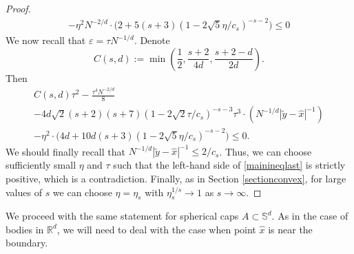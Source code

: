 \documentclass[12pt]{amsart}
\theoremstyle{definition}
\def\R{\mathbb{R}}
\def\ep{\varepsilon}
\newcommand{\1}{\mathbf{1}}
\renewcommand\S{\mathbb{S}}
\begin{document}
\begin{proof}
\begin{multline}
-\eta^2 N^{-2/d}\cdot \Big(2+5 (s+3)(1-2\sqrt{5}\eta / c_s)^{-s-2}\Big)  \leqslant 0
\end{multline}
We now recall that $\ep=\tau N^{-1/d}$. Denote 
$$
C(s,d):=\min\left(\frac12, \frac{s+2}{4d}, \frac{s+2-d}{2d}\right).
$$
Then 
\begin{multline}\label{mainineqlast}
C(s,d)\tau^2 - \frac{\tau^4 N^{-2/d}}8  \\ 
-4d\sqrt{2}(s+2)(s+7)(1-2\sqrt{2}\tau/c_s)^{-s-3} \tau^3  \cdot (N^{-1/d}|\tilde y-\hat{x}|^{-1})  \\ 
-\eta^2 \cdot \Big(4d+10d (s+3)(1-2\sqrt{5}\eta / c_s)^{-s-2}\Big)  \leqslant 0.
\end{multline}
We should finally recall that $N^{-1/d}|\tilde y-\hat{x}|^{-1}\leqslant 2/c_s$. Thus, we can choose sufficiently small $\eta$ and $\tau$ such that the left-hand side of \eqref{mainineqlast} is strictly positive, which is a contradiction. Finally, as in Section \ref{sectionconvex}, for large values of $s$ we can choose $\eta=\eta_s$ with $\eta_s^{1/s} \to 1$ as $s\to \infty$.
\end{proof}

We proceed with the same statement for spherical caps $A\subset \S^d$. As in the case of bodies in $\R^d$, we will need to deal with the case when point $\hat{x}$ is near the boundary. 
\end{document}
